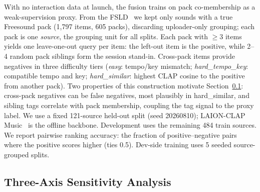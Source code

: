 \documentclass{article}
\begin{document}
With no interaction data at launch, the fusion trains on pack
co-membership as a weak-supervision proxy.
From the FSLD~\cite{ramires2020fsld} we kept only sounds with a
true Freesound pack (1,797 items, 605 packs), discarding
uploader-only grouping; each pack is one \emph{source}, the
grouping unit for all splits.
Each pack with $\geq$3 items yields one leave-one-out query per
item: the left-out item is the positive, while 2--4 random pack
siblings form the session stand-in.  Cross-pack items provide negatives in three
difficulty tiers (\emph{easy}: tempo/key mismatch;
\emph{hard\_tempo\_key}: compatible tempo and key;
\emph{hard\_similar}: highest CLAP cosine to the positive from
another pack).  Two properties of this construction
motivate Section~\ref{sec:observations}: cross-pack negatives can
be false negatives, most plausibly in hard\_similar, and sibling
tags correlate with pack membership, coupling the tag signal to
the proxy label.
We use a fixed 121-source held-out split (seed 20260810);
LAION-CLAP Music~\cite{wu2023laionclap} is the offline backbone.
Development uses the remaining 484 train sources.
We report pairwise ranking accuracy: the fraction of
positive--negative pairs where the positive scores higher (ties
0.5).  Dev-side training uses 5 seeded source-grouped splits.

\subsection{Three-Axis Sensitivity Analysis}\label{sec:observations}
\end{document}
